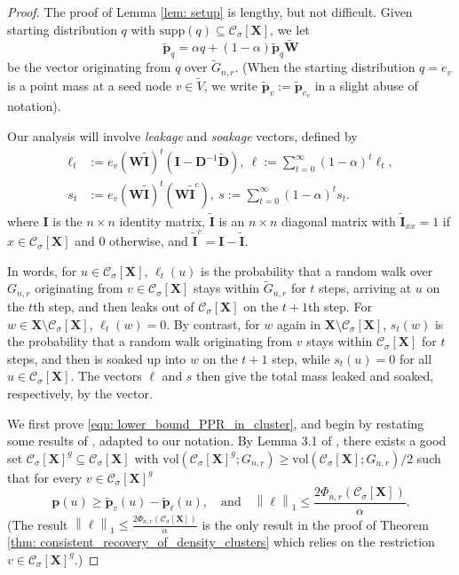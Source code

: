 \documentclass{article}
\let\pprspace\relax
\newcommand{\vol}{\mathrm{vol}}
\newcommand{\norm}[1]{\left\lVert#1\right\rVert}
\newcommand{\1}{\mathbf{1}}
\newcommand{\pbf}{\mathbf{p}}
\newcommand{\Xbf}{\mathbf{X}}
\newcommand{\Wbf}{\mathbf{W}}
\newcommand{\Dbf}{\mathbf{D}}
\newcommand{\Cset}{\mathcal{C}}
\newcommand{\Csig}{\Cset_{\sigma}}
\newcommand{\pprspace}{{\sc PPR~}}
\newcommand{\wDbf}{\widetilde{\Dbf}}
\theoremstyle{aldenthm}
\begin{document}
\begin{proof}
	The proof of Lemma \ref{lem: setup} is lengthy, but not difficult. Given starting distribution $q$ with $\mathrm{supp}(q) \subseteq \Csig[\Xbf]$, we let
	\begin{equation}
	\widetilde{\pbf}_q = \alpha q + (1 - \alpha) \widetilde{\pbf}_{q} \widetilde{\Wbf}
	\end{equation}
	be the \pprspace vector originating from $q$ over $\widetilde{G}_{n,r}$. (When the starting distribution $q = e_v$ is a point mass at a seed node $v \in \widetilde{V}$, we write $\widetilde{\pbf}_v := \widetilde{\pbf}_{e_v}$ in a slight abuse of notation).
	
	Our analysis will involve \emph{leakage} and \emph{soakage} vectors, defined by
	\begin{align}
	\label{eqn: leakage_soakage}
	\ell_t & := e_v (\Wbf \widetilde{\mathbf{I}} )^t (\mathbf{I} - \Dbf^{-1} \wDbf),~ \ell := \sum_{t = 0}^{\infty} (1 - \alpha)^t \ell_t, \nonumber \\
	s_t & := e_v (\Wbf \widetilde{\mathbf{I}} )^t (\Wbf \widetilde{\mathbf{I}}^c),~ s := \sum_{t = 0}^{\infty} (1 - \alpha)^{t} s_t.
	\end{align}
	where $\mathbf{I}$ is the $n \times n$ identity matrix, $\widetilde{\mathbf{I}}$ is an $n \times n$ diagonal matrix with $\widetilde{\mathbf{I}}_{xx} = 1$ if $x \in \Csig[\Xbf]$ and $0$ otherwise, and $\widetilde{\mathbf{I}}^c = \mathbf{I} - \widetilde{\mathbf{I}}$.
	
	In words, for $u \in \Csig[\Xbf]$, $\ell_t(u)$ is the probability that a random walk over $G_{n,r}$ originating from $v \in \Csig[\Xbf]$ stays within $\widetilde{G}_{n,r}$ for $t$ steps, arriving at $u$ on the $t$th step, and then leaks out of $\Csig[\Xbf]$ on the $t + 1$th step. For $w \in \Xbf \setminus \Csig[\Xbf]$, $\ell_t(w) = 0$. By contrast, for $w$ again in $\Xbf \setminus \Csig[\Xbf]$, $s_t(w)$ is the probability that a random walk originating from $v$ stays within $\Csig[\Xbf]$ for $t$ steps, and then is soaked up into $w$ on the $t + 1$ step, while $s_t(u) = 0$ for all $u \in \Csig[\Xbf]$. The vectors $\ell$ and $s$ then give the total mass leaked and soaked, respectively, by the \pprspace vector. 
	
	We first prove \eqref{eqn: lower_bound_PPR_in_cluster}, and begin by restating some results of \citep{zhu2013}, adapted to our notation. By Lemma 3.1 of \citep{zhu2013}, there exists a good set $\Csig[\Xbf]^g \subseteq \Csig[\Xbf]$ with $\vol(\Csig[\Xbf]^g; G_{n,r}) \geq \vol(\Csig[\Xbf]; G_{n,r})/2$ such that for every $v \in \Csig[\Xbf]^g$
	\begin{equation}
	\label{eqn: zhulemma3.1}
	\pbf(u) \geq \widetilde{\pbf}_v(u) - \widetilde{\pbf}_{\ell}(u), \quad \textrm{and} \quad \norm{\ell}_1 \leq \frac{2 \Phi_{n,r}(\Csig[\Xbf])}{\alpha}.
	\end{equation}
	(The result $\norm{\ell}_1 \leq \frac{2 \Phi_{n,r}(\Csig[\Xbf])}{\alpha}$ is the only result in the proof of Theorem \ref{thm: consistent_recovery_of_density_clusters} which relies on the restriction $v \in \Csig[\Xbf]^g$.)
	

\end{proof}
\end{document}
